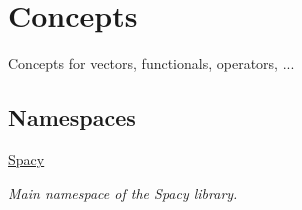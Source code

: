 \hypertarget{group__ConceptGroup}{}\section{Concepts}
\label{group__ConceptGroup}


Concepts for vectors, functionals, operators, ...  


\subsection*{Namespaces}
\begin{DoxyCompactItemize}
\item 
 \hyperlink{namespaceSpacy}{Spacy}
\begin{DoxyCompactList}\small\item\em Main namespace of the Spacy library. \end{DoxyCompactList}\end{DoxyCompactItemize}
